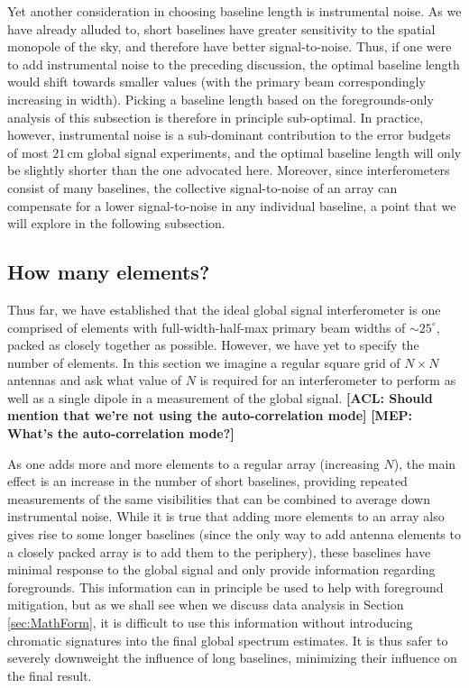 \documentclass[twolcolumn,apj,iop,numberedappendix]{emulateapj}
\newcommand{\acl}[1]{{\color{red} \textbf{[ACL:  #1]}}}
\newcommand{\mep}[1]{{\color{applegreen} \textbf{[MEP:  #1]}}}
\begin{document}
Yet another consideration in choosing baseline length is instrumental noise. As we have already alluded to, short baselines have greater sensitivity to the spatial monopole of the sky, and therefore have better signal-to-noise. Thus, if one were to add instrumental noise to the preceding discussion, the optimal baseline length would shift towards smaller values (with the primary beam correspondingly increasing in width). Picking a baseline length based on the foregrounds-only analysis of this subsection is therefore in principle sub-optimal. In practice, however, instrumental noise is a sub-dominant contribution to the error budgets of most $21\,\textrm{cm}$ global signal experiments, and the optimal baseline length will only be slightly shorter than the one advocated here. Moreover, since interferometers consist of many baselines, the collective signal-to-noise of an array can compensate for a lower signal-to-noise in any individual baseline, a point that we will explore in the following subsection.

\subsection{How many elements?}
\label{sec:numElems}
Thus far, we have established that the ideal global signal interferometer is one comprised of elements with full-width-half-max primary beam widths of $\sim25^\circ$, packed as closely together as possible. However, we have yet to specify the number of elements. In this section we imagine a regular square grid of $N \times N$ antennas and ask what value of $N$ is required for an interferometer to perform as well as a single dipole in a measurement of the global signal.\acl{Should mention that we're not using the auto-correlation mode} \mep{What's the auto-correlation mode?}

As one adds more and more elements to a regular array (increasing $N$), the main effect is an increase in the number of short baselines, providing repeated measurements of the same visibilities that can be combined to average down instrumental noise. While it is true that adding more elements to an array also gives rise to some longer baselines (since the only way to add antenna elements to a closely packed array is to add them to the periphery), these baselines have minimal response to the global signal and only provide information regarding foregrounds. This information can in principle be used to help with foreground mitigation, but as we shall see when we discuss data analysis in Section \ref{sec:MathForm}, it is difficult to use this information without introducing chromatic signatures into the final global spectrum estimates. It is thus safer to severely downweight the influence of long baselines, minimizing their influence on the final result.
\end{document}
